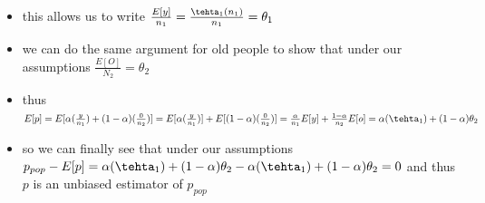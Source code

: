 \documentclass[12pt,twoside]{article}
\begin{document}
\begin{enumerate}
\begin{enumerate}
\begin{itemize}
    \item this allows us to write $\frac{E[y]}{n_1}=\frac{\tehta_1 (n_1)}{n_1}=\theta_1$
    \item we can do the same argument for old people to show that under our assumptions $\frac{E[O]}{N_2}=\theta_2$
    \item thus $E[p]=E[\alpha(\frac{y}{n_1})+(1-\alpha)(\frac{0}{n_2})]=E[\alpha(\frac{y}{n_1})]+E[(1-\alpha)(\frac{0}{n_2})]=\frac{\alpha}{n_1}E[y]+\frac{1-\alpha}{n_2}E[o]=\alpha (\tehta_1)+(1-\alpha)\theta_2$
    \item so we can finally see that under our assumptions $p_{pop}-E[p]=\alpha (\tehta_1)+(1-\alpha)\theta_2-\alpha (\tehta_1)+(1-\alpha)\theta_2=0$ and thus $p$ is an unbiased estimator of $p_{pop}$
    \end{itemize}


\end{enumerate}
\end{enumerate}
\end{document}
